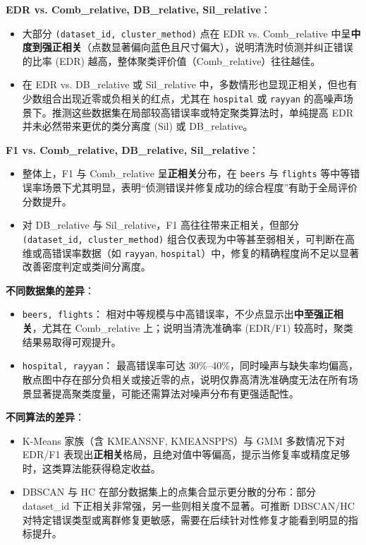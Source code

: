 \documentclass[10pt]{article} %
\numberwithin{equation}{section}
\begin{document}
\begin{enumerate}[label=(\alph*)]
\textbf{EDR vs. Comb\_relative, DB\_relative, Sil\_relative}：
    \begin{itemize}
        \item 大部分 \texttt{(dataset\_id, cluster\_method)} 点在 EDR vs. Comb\_relative 中呈\textbf{中度到强正相关}（点数显著偏向蓝色且尺寸偏大），说明清洗时侦测并纠正错误的比率 (EDR) 越高，整体聚类评价值（Comb\_relative）往往越佳。  
        \item 在 EDR vs. DB\_relative 或 Sil\_relative 中，多数情形也显现正相关，但也有少数组合出现近零或负相关的红点，尤其在 \texttt{hospital} 或 \texttt{rayyan} 的高噪声场景下。推测这些数据集在局部较高错误率或特定聚类算法时，单纯提高 EDR 并未必然带来更优的类分离度 (Sil) 或 DB\_relative。
    \end{itemize}

\textbf{F1 vs. Comb\_relative, DB\_relative, Sil\_relative}：
    \begin{itemize}
        \item 整体上，F1 与 Comb\_relative 呈\textbf{正相关}分布，在 \texttt{beers} 与 \texttt{flights} 等中等错误率场景下尤其明显，表明“侦测错误并修复成功的综合程度”有助于全局评价分数提升。  
        \item 对 DB\_relative 与 Sil\_relative，F1 高往往带来正相关，但部分 \texttt{(dataset\_id, cluster\_method)} 组合仅表现为中等甚至弱相关，可判断在高维或高错误率数据（如 \texttt{rayyan}, \texttt{hospital}）中，修复的精确程度尚不足以显著改善密度判定或类间分离度。
    \end{itemize}

\textbf{不同数据集的差异}：
    \begin{itemize}
        \item \texttt{beers, flights}： 相对中等规模与中高错误率，不少点显示出\textbf{中至强正相关}，尤其在 Comb\_relative 上；说明当清洗准确率 (EDR/F1) 较高时，聚类结果易取得可观提升。  
        \item \texttt{hospital, rayyan}： 最高错误率可达 30\%--40\%，同时噪声与缺失率均偏高，散点图中存在部分负相关或接近零的点，说明仅靠高清洗准确度无法在所有场景显著提高聚类度量，可能还需算法对噪声分布有更强适配性。
    \end{itemize}

\textbf{不同算法的差异}：
    \begin{itemize}
        \item K-Means 家族（含 KMEANSNF, KMEANSPPS）与 GMM 多数情况下对 EDR/F1 表现出\textbf{正相关}格局，且绝对值中等偏高，提示当修复率或精度足够时，这类算法能获得稳定收益。  
        \item DBSCAN 与 HC 在部分数据集上的点集合显示更分散的分布：部分 dataset\_id 下正相关非常强，另一些则相关度不显著。可推断 DBSCAN/HC 对特定错误类型或离群修复更敏感，需要在后续针对性修复才能看到明显的指标提升。
    \end{itemize}


\end{enumerate}
\end{document}

